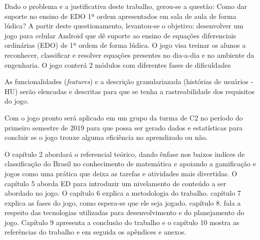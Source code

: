 Dado o problema e a justificativa deste trabalho, gerou-se a questão: Como dar suporte no ensino de EDO 1ª ordem apresentados em sala de aula de forma lúdica? A partir deste questionamento, levantou-se o objetivo: desenvolver um jogo para celular Android que dê suporte ao ensino de equações diferenciais ordinárias (EDO) de 1ª ordem de forma lúdica. O jogo visa treinar os alunos a reconhecer, classificar e resolver equações presentes no dia-a-dia e no ambiente da engenharia.
O jogo conterá 2 módulos com diferentes fases de dificuldades 

As funcionalidades (\textit{features}) e a descrição granulariazada (histórias de usuários - HU) serão elencadas e descritas para que se tenha a rastreabilidade dos requisitos do jogo. 

Com o jogo pronto será aplicado em um grupo da turma de C2 no período do primeiro semestre de 2019 para que possa ser gerado dados e estatísticas para concluir se o jogo trouxe alguma eficiência no aprendizado ou não.

O capítulo 2 abordará o referencial teórico, dando ênfase nos baixos indíces de classificação do Brasil no conhecimento de matemática e apoiando a gamificação e jogos como uma prática que deixa as tarefas e atividades mais divertidas.
O capítulo 5 aborda ED para introduzir um nivelamento de conteúdo a ser abordado no jogo. O capítulo 6 explica a metodologia do trabalho. capítulo 7 explica as fases do jogo, como espera-se que ele seja jogado. capítulo 8. fala a respeito das tecnologias utilizadas para desenvolvimento e do planejamento do jogo. Capítulo 9 apresenta a conclusão do trabalho e o capítulo 10 mostra as referências do trabalho e em seguida os apêndices e anexos.